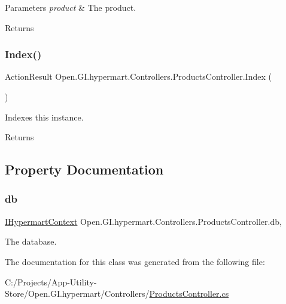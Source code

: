 \begin{DoxyParams}{Parameters}
{\em product} & The product.\\
\hline
\end{DoxyParams}
\begin{DoxyReturn}{Returns}

\end{DoxyReturn}
\hypertarget{class_open_1_1_g_i_1_1hypermart_1_1_controllers_1_1_products_controller_a244e974803aa1c0f91e8a4fcf0618a9d}{}\label{class_open_1_1_g_i_1_1hypermart_1_1_controllers_1_1_products_controller_a244e974803aa1c0f91e8a4fcf0618a9d} 
\subsubsection{\texorpdfstring{Index()}{Index()}}
{\footnotesize\ttfamily Action\+Result Open.\+G\+I.\+hypermart.\+Controllers.\+Products\+Controller.\+Index (\begin{DoxyParamCaption}{ }\end{DoxyParamCaption})}



Indexes this instance. 

\begin{DoxyReturn}{Returns}

\end{DoxyReturn}


\subsection{Property Documentation}
\hypertarget{class_open_1_1_g_i_1_1hypermart_1_1_controllers_1_1_products_controller_aec73a09108adc7af8384701886c5e53a}{}\label{class_open_1_1_g_i_1_1hypermart_1_1_controllers_1_1_products_controller_aec73a09108adc7af8384701886c5e53a} 
\subsubsection{\texorpdfstring{db}{db}}
{\footnotesize\ttfamily \hyperlink{interface_open_1_1_g_i_1_1hypermart_1_1_d_a_l_1_1_i_hypermart_context}{I\+Hypermart\+Context} Open.\+G\+I.\+hypermart.\+Controllers.\+Products\+Controller.\+db\hspace{0.3cm}{\ttfamily [get]}, {\ttfamily [set]}}





The database. 

The documentation for this class was generated from the following file\+:\begin{DoxyCompactItemize}
\item 
C\+:/\+Projects/\+App-\/\+Utility-\/\+Store/\+Open.\+G\+I.\+hypermart/\+Controllers/\hyperlink{_products_controller_8cs}{Products\+Controller.\+cs}\end{DoxyCompactItemize}
